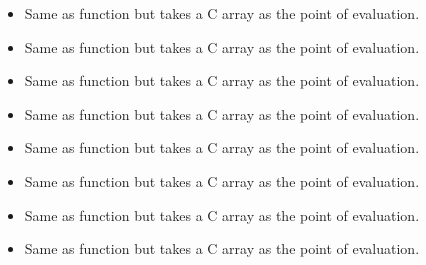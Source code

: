 \begin{itemize}
\item {}
  \sshortdescribe Same as function  but takes a
  C array as the point of evaluation.
\item  {}
  \sshortdescribe Same as function  but takes a
  C array as the point of evaluation.
\item {}
  \sshortdescribe Same as function  but takes a
  C array as the point of evaluation.
\item {}
  \sshortdescribe Same as function  but takes a
  C array as the point of evaluation.
\item {}
  \sshortdescribe Same as function  but takes a
  C array as the point of evaluation.
\item {}
  \sshortdescribe Same as function  but takes a
  C array as the point of evaluation.
\item {}
  \sshortdescribe Same as function  but takes a 
  C array as the point of evaluation.
\item {}
  \sshortdescribe Same as function  but takes a
  C array as the point of evaluation.
\end{itemize}



